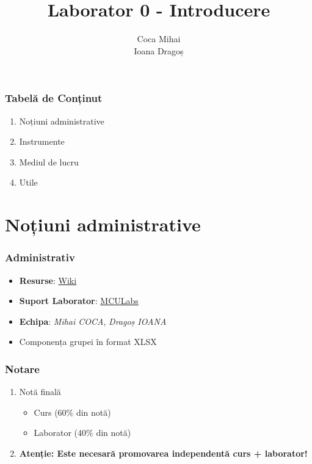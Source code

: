 \documentclass[xcolor={table}]{beamer}
\title{Laborator 0 - Introducere}
\subtitle{}
\author{
        Coca Mihai\\
        Ioana Dragoș
        }
\begin{document}
	\setcounter{showProgressBar}{0}
	\setcounter{showSlideNumbers}{0}

	\frame{\titlepage}

	\begin{frame}
		\frametitle{Tabelă de Conținut}
		\begin{enumerate}
			\item Noțiuni administrative
			\item Instrumente
			\item Mediul de lucru
			\item Utile
		\end{enumerate}
	\end{frame}

	\setcounter{framenumber}{0}
	\setcounter{showProgressBar}{1}
	\setcounter{showSlideNumbers}{1}
	\section{Noțiuni administrative}
		\begin{frame}
			\frametitle{Administrativ}
			\begin{itemize}
			    \item \textbf{Resurse}: \href{https://wiki.mta.ro/c/4/ssmp/start}{Wiki}
			    \item \textbf{Suport Laborator}: \href{https://github.com/undacmic/MCULabs}{MCULabs}
			    \item \textbf{Echipa}: \textit{Mihai COCA}, \textit{Dragoș IOANA}
			    \item Componența grupei în format XLSX
			    
			\end{itemize}
		\end{frame}

		\begin{frame}
			\frametitle{Notare}
			\begin{enumerate}
				\item Notă finală
					\begin{itemize}
    			        \item Curs ($ 60\% $ din notă)
    			        \item Laborator ($ 40\% $ din notă)
    			    \end{itemize}
				\item \textbf{Atenție: Este necesară promovarea independentă curs + laborator!}
			\end{enumerate}
		\end{frame}
		
\end{document}
